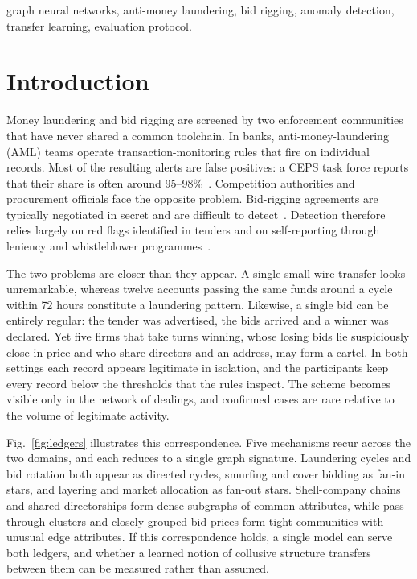 \documentclass[conference]{IEEEtran}
\begin{document}
\begin{IEEEkeywords}
graph neural networks, anti-money laundering, bid rigging, anomaly detection, transfer learning, evaluation protocol.
\end{IEEEkeywords}

\section{Introduction}

Money laundering and bid rigging are screened by two enforcement communities
that have never shared a common toolchain. In banks, anti-money-laundering (AML)
teams operate transaction-monitoring rules that fire on individual records.
Most of the resulting alerts are false positives: a CEPS task force reports
that their share is often around 95--98\%~\cite[pp.~3, 31]{lannoo2021}.
Competition authorities and procurement officials face the opposite problem.
Bid-rigging agreements are typically negotiated in secret and are difficult to
detect~\cite[p.~23]{oecd2025}. Detection therefore relies largely on red flags
identified in tenders and on self-reporting through leniency and whistleblower
programmes~\cite[pp.~12, 14]{oecd2025}.

The two problems are closer than they appear. A single small wire transfer
looks unremarkable, whereas twelve accounts passing the same funds around a
cycle within 72 hours constitute a laundering pattern. Likewise, a single bid
can be entirely regular: the tender was advertised, the bids arrived and a
winner was declared. Yet five firms that take turns winning, whose losing bids
lie suspiciously close in price and who share directors and an address, may
form a cartel. In both settings each record appears legitimate in isolation,
and the participants keep every record below the thresholds that the rules
inspect. The scheme becomes visible only in the network of dealings, and
confirmed cases are rare relative to the volume of legitimate activity.

Fig.~\ref{fig:ledgers} illustrates this correspondence. Five mechanisms recur
across the two domains, and each reduces to a single graph signature.
Laundering cycles and bid rotation both appear as directed cycles, smurfing and
cover bidding as fan-in stars, and layering and market allocation as fan-out
stars. Shell-company chains and shared directorships form dense subgraphs of
common attributes, while pass-through clusters and closely grouped bid prices
form tight communities with unusual edge attributes. If this correspondence
holds, a single model can serve both ledgers, and whether a learned notion of
collusive structure transfers between them can be measured rather than
assumed.
\end{document}

